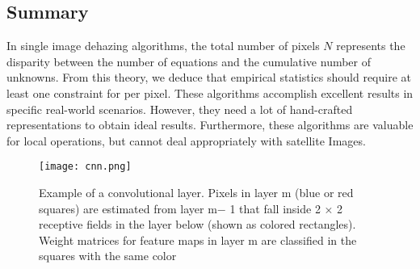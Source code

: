 \documentclass[doctor,english,listoffigures,listoftables]{thesis-uestc}
\begin{document}
\subsection{Summary} 
In single image dehazing algorithms, the total number of pixels $N$ represents the disparity between the number of equations and the cumulative number of unknowns. From this theory, we deduce that empirical statistics should require at least one constraint for per pixel. These algorithms accomplish excellent results in specific real-world scenarios. However, they need a lot of hand-crafted representations to obtain ideal results. Furthermore, these algorithms are valuable for local operations, but cannot deal appropriately with satellite Images. 
\begin{figure}[H]
\texttt{[image: cnn.png]}
\caption{Example of a convolutional layer. Pixels in layer m (blue or red squares) are estimated from layer m− 1 that fall inside 2 × 2 receptive fields in the layer below (shown as colored rectangles). Weight matrices for feature maps in layer m are classified in the squares with the same color}
\label{cn}
\end{figure} 
\end{document}
